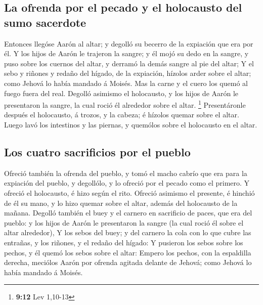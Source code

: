 \hypertarget{la-ofrenda-por-el-pecado-y-el-holocausto-del-sumo-sacerdote}{%
\subsection{La ofrenda por el pecado y el holocausto del sumo
sacerdote}\label{la-ofrenda-por-el-pecado-y-el-holocausto-del-sumo-sacerdote}}

 Entonces llegóse Aarón al altar; y degolló su becerro de la
expiación que era por él.  Y los hijos de Aarón le trajeron
la sangre; y él mojó su dedo en la sangre, y puso sobre los cuernos del
altar, y derramó la demás sangre al pie del altar;  Y el
sebo y riñones y redaño del hígado, de la expiación, hízolos arder sobre
el altar; como Jehová lo había mandado á Moisés.  Mas la
carne y el cuero los quemó al fuego fuera del real. 
Degolló asimismo el holocausto, y los hijos de Aarón le presentaron la
sangre, la cual roció él alrededor sobre el altar. \footnote{\textbf{9:12}
  Lev 1,10-13}  Presentáronle después el holocausto, á
trozos, y la cabeza; é hízolos quemar sobre el altar. 
Luego lavó los intestinos y las piernas, y quemólos sobre el holocausto
en el altar.

\hypertarget{los-cuatro-sacrificios-por-el-pueblo}{%
\subsection{Los cuatro sacrificios por el
pueblo}\label{los-cuatro-sacrificios-por-el-pueblo}}

 Ofreció también la ofrenda del pueblo, y tomó el macho
cabrío que era para la expiación del pueblo, y degollólo, y lo ofreció
por el pecado como el primero.  Y ofreció el holocausto, é
hizo según el rito.  Ofreció asimismo el presente, é
hinchió de él su mano, y lo hizo quemar sobre el altar, además del
holocausto de la mañana.  Degolló también el buey y el
carnero en sacrificio de paces, que era del pueblo: y los hijos de Aarón
le presentaron la sangre (la cual roció él sobre el altar alrededor),
 Y los sebos del buey; y del carnero la cola con lo que
cubre las entrañas, y los riñones, y el redaño del hígado: 
Y pusieron los sebos sobre los pechos, y él quemó los sebos sobre el
altar:  Empero los pechos, con la espaldilla derecha,
meciólos Aarón por ofrenda agitada delante de Jehová; como Jehová lo
había mandado á Moisés.

